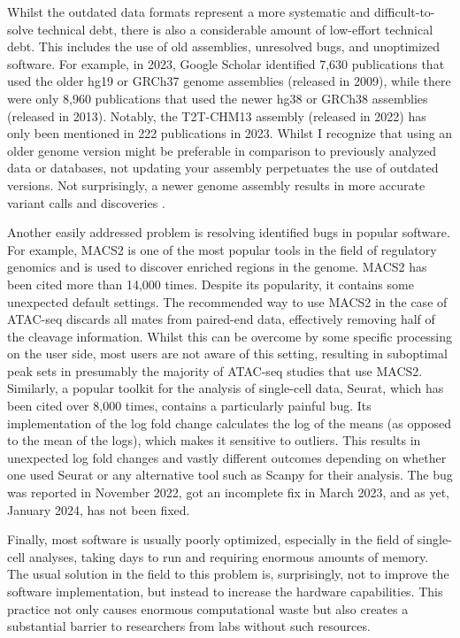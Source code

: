 Whilst the outdated data formats represent a more systematic and difficult-to-solve technical debt, there is also a considerable amount of low-effort technical debt. This includes the use of old assemblies, unresolved bugs, and unoptimized software. For example, in 2023, Google Scholar identified 7,630 publications that used the older hg19 or GRCh37 genome assemblies (released in 2009), while there were only 8,960 publications that used the newer hg38 or GRCh38 assemblies (released in 2013). Notably, the T2T-CHM13 assembly (released in 2022) has only been mentioned in 222 publications in 2023. Whilst I recognize that using an older genome version might be preferable in comparison to previously analyzed data or databases, not updating your assembly perpetuates the use of outdated versions. Not surprisingly, a newer genome assembly results in more accurate variant calls and discoveries \cite{Aganezov2022,Pan2019,Guo2017}. 

Another easily addressed problem is resolving identified bugs in popular software. For example, MACS2 is one of the most popular tools in the field of regulatory genomics and is used to discover enriched regions in the genome. MACS2 has been cited more than 14,000 times\cite{Zhang2008}. Despite its popularity, it contains some unexpected default settings. The recommended way to use MACS2 in the case of ATAC-seq discards all mates from paired-end data, effectively removing half of the cleavage information\cite{Gaspar2018}. Whilst this can be overcome by some specific processing on the user side, most users are not aware of this setting, resulting in suboptimal peak sets in presumably the majority of ATAC-seq studies that use MACS2. Similarly, a popular toolkit for the analysis of single-cell data, Seurat, which has been cited over 8,000 times, contains a particularly painful bug. Its implementation of the log fold change calculates the log of the means (as opposed to the mean of the logs), which makes it sensitive to outliers. This results in unexpected log fold changes and vastly different outcomes depending on whether one used Seurat or any alternative tool such as Scanpy for their analysis. The bug was reported in November 2022, got an incomplete fix in March 2023, and as yet, January 2024, has not been fixed\cite{WatsonHaigh}. 

Finally, most software is usually poorly optimized, especially in the field of single-cell analyses, taking days to run and requiring enormous amounts of memory\cite{Pratapa_2020}. The usual solution in the field to this problem is, surprisingly, not to improve the software implementation, but instead to increase the hardware capabilities. This practice not only causes enormous computational waste but also creates a substantial barrier to researchers from labs without such resources.

